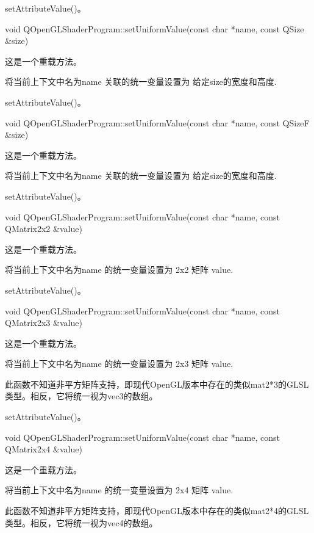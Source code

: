 \begin{seeAlso}
setAttributeValue()。
\end{seeAlso}

void QOpenGLShaderProgram::setUniformValue(const char *name, const QSize \&size)

这是一个重载方法。

将当前上下文中名为name 关联的统一变量设置为 给定size的宽度和高度.


\begin{seeAlso}
setAttributeValue()。
\end{seeAlso}

void QOpenGLShaderProgram::setUniformValue(const char *name, const QSizeF \&size)

这是一个重载方法。

将当前上下文中名为name 关联的统一变量设置为 给定size的宽度和高度.


\begin{seeAlso}
setAttributeValue()。
\end{seeAlso}

void QOpenGLShaderProgram::setUniformValue(const char *name, const QMatrix2x2 \&value)

这是一个重载方法。

将当前上下文中名为name 的统一变量设置为 2x2 矩阵 value.


\begin{seeAlso}
setAttributeValue()。
\end{seeAlso}

void QOpenGLShaderProgram::setUniformValue(const char *name, const QMatrix2x3 \&value)

这是一个重载方法。

将当前上下文中名为name 的统一变量设置为 2x3 矩阵 value.

\begin{notice}
此函数不知道非平方矩阵支持，即现代OpenGL版本中存在的类似mat2*3的GLSL类型。相反，它将统一视为vec3的数组。
\end{notice}

\begin{seeAlso}
setAttributeValue()。
\end{seeAlso}

void QOpenGLShaderProgram::setUniformValue(const char *name, const QMatrix2x4 \&value)

这是一个重载方法。

将当前上下文中名为name 的统一变量设置为 2x4 矩阵 value.


\begin{notice}
此函数不知道非平方矩阵支持，即现代OpenGL版本中存在的类似mat2*4的GLSL类型。相反，它将统一视为vec4的数组。
\end{notice}

